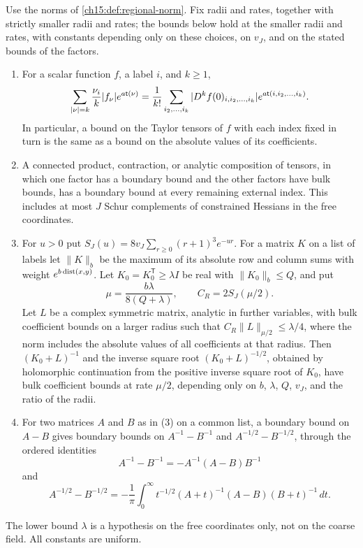 \begin{lemma}\label{ch15:lem:boundary-algebra}
Use the norms of \cref{ch15:def:regional-norm}. Fix radii and rates, together with strictly smaller radii and rates; the bounds below hold at the smaller radii and rates, with constants depending only on these choices, on $v_J$, and on the stated bounds of the factors.
\begin{enumerate}
\item For a scalar function $f$, a label $i$, and $k\ge1$,
\begin{equation}\label{ch15:eq:root-fraction}
 \sum_{|\nu|=k}\frac{\nu_i}{k}|f_\nu|e^{a\mathsf t(\nu)}
 =\frac1{k!}\sum_{i_2,\ldots,i_k}
       |D^kf(0)_{i,i_2,\ldots,i_k}|e^{a\mathsf t(i,i_2,\ldots,i_k)}.
\end{equation}
In particular, a bound on the Taylor tensors of $f$ with each index fixed in turn is the same as a bound on the absolute values of its coefficients.
\item A connected product, contraction, or analytic composition of tensors, in which one factor has a boundary bound and the other factors have bulk bounds, has a boundary bound at every remaining external index. This includes at most $J$ Schur complements of constrained Hessians in the free coordinates.
\item For $u>0$ put $S_J(u)=8v_J\sum_{r\ge0}(r+1)^3e^{-ur}$. For a matrix $K$ on a list of labels let $\|K\|_b$ be the maximum of its absolute row and column sums with weight $e^{b\operatorname{dist}(x,y)}$. Let $K_0=K_0^{\mathsf T}\ge\lambda I$ be real with $\|K_0\|_b\le Q$, and put
\[
 \mu=\frac{b\lambda}{8(Q+\lambda)},\qquad C_R=2S_J(\mu/2).
\]
Let $L$ be a complex symmetric matrix, analytic in further variables, with bulk coefficient bounds on a larger radius such that $C_R\|L\|_{\mu/2}\le\lambda/4$, where the norm includes the absolute values of all coefficients at that radius. Then $(K_0+L)^{-1}$ and the inverse square root $(K_0+L)^{-1/2}$, obtained by holomorphic continuation from the positive inverse square root of $K_0$, have bulk coefficient bounds at rate $\mu/2$, depending only on $b$, $\lambda$, $Q$, $v_J$, and the ratio of the radii.
\item For two matrices $A$ and $B$ as in (3) on a common list, a boundary bound on $A-B$ gives boundary bounds on $A^{-1}-B^{-1}$ and $A^{-1/2}-B^{-1/2}$, through the ordered identities
\[
 A^{-1}-B^{-1}=-A^{-1}(A-B)B^{-1}
\]
and
\[
 A^{-1/2}-B^{-1/2}=-\frac1\pi\int_0^\infty
 t^{-1/2}(A+t)^{-1}(A-B)(B+t)^{-1}\,dt.
\]
\end{enumerate}
The lower bound $\lambda$ is a hypothesis on the free coordinates only, not on the coarse field. All constants are uniform.
\end{lemma}

